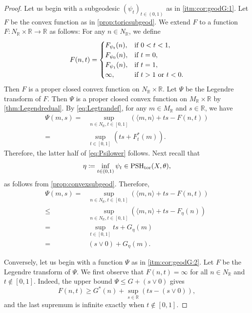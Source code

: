\begin{proof}
    Let us begin with a subgeodesic $(\psi_t)_{t\in (0,1)}$ as in \ref{itm:cor:geodG:1}. Let $F$ be the convex function as in \cref{prop:toricsubgeod}.
    We extend $F$ to a function $F\colon N_{\mathbb{R}}\times \mathbb{R}\rightarrow \mathbb{R}$ as follows: For any $n\in N_{\mathbb{R}}$, we define
\[
F(n,t)=\begin{cases}
    F_{\psi_t}(n),&\textup{if }0<t<1,\\
    F_{\psi_0}(n),& \textup{if }t=0,\\
    F_{\psi_1}(n),&\textup{if }t=1,\\
    \infty,&\textup{if } t>1 \textup{ or }t<0.
\end{cases}
\]
Then $F$ is a proper closed convex function on $N_{\mathbb{R}}\times \mathbb{R}$. Let $\Psi$ be the Legendre transform of $F$. Then $\Psi$ is a proper closed convex function on $M_{\mathbb{R}}\times \mathbb{R}$ by \cref{thm:Legendredual}.
By \eqref{eq:Legtrandef}, for any $m\in M_{\mathbb{R}}$ and $s\in \mathbb{R}$, we have
\[
\begin{aligned}
\Psi(m,s)=&\sup_{n\in N_{\mathbb{R}},t\in [0,1]} \left( \langle m,n\rangle + ts-F(n,t)\right)\\
=& \sup_{t\in [0,1]} \left( ts+F_t^*(m) \right).
\end{aligned}
\]
Therefore, the latter half of \eqref{eq:Psilower} follows. Next recall that
\[
\eta\coloneqq \inf_{t\in (0,1)}\psi_t\in \mathrm{PSH}_{\mathrm{tor}}(X,\theta),
\]
as follows from \cref{prop:convexsubgeod}. Therefore,
\[
\begin{aligned}
\Psi(m,s)=&\sup_{n\in N_{\mathbb{R}},t\in [0,1]} \left( \langle m,n\rangle + ts-F(n,t)\right)\\
\leq & \sup_{n\in N_{\mathbb{R}},t\in [0,1]} \left( \langle m,n\rangle + ts-F_{\eta}(n)\right)\\
=& \sup_{t\in [0,1]}ts+G_{\eta}(m)\\
=& (s\lor 0)+G_{\eta}(m).
\end{aligned}
\]

Conversely, let us begin with a function $\Psi$ as in \ref{itm:cor:geodG:2}. Let $F$ be the Legendre transform of $\Psi$.
We first observe that $F(n,t)=\infty$ for all $n\in N_{\mathbb{R}}$ and $t\not\in [0,1]$.
Indeed, the upper bound $\Psi\leq G+(s\lor 0)$ gives
\[
F(n,t)\geq G^*(n)+\sup_{s\in\mathbb{R}}\left(ts-(s\lor 0)\right),
\]
and the last supremum is infinite exactly when $t\notin[0,1]$.


\end{proof}

